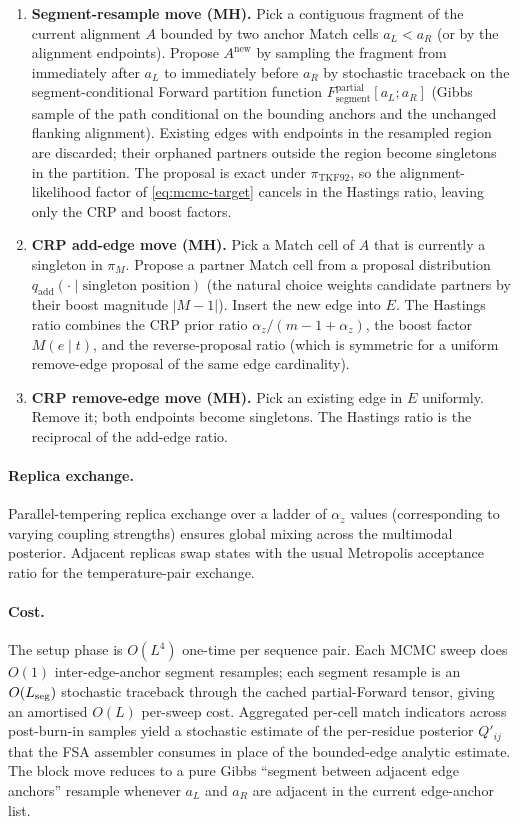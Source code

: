 \begin{enumerate}
\item \textbf{Segment-resample move (MH).} Pick a contiguous
  fragment of the current alignment $A$ bounded by two anchor
  Match cells $a_L < a_R$ (or by the alignment endpoints). Propose
  $A^{\mathrm{new}}$ by sampling the fragment from immediately
  after $a_L$ to immediately before $a_R$ by stochastic traceback
  on the segment-conditional Forward partition function
  $F^{\mathrm{partial}}_{\mathrm{segment}}[a_L; a_R]$ (Gibbs sample
  of the path conditional on the bounding anchors and the
  unchanged flanking alignment). Existing edges with endpoints in
  the resampled region are discarded; their orphaned partners
  outside the region become singletons in the partition. The
  proposal is exact under $\pi_{\mathrm{TKF92}}$, so the
  alignment-likelihood factor of \eqref{eq:mcmc-target} cancels in
  the Hastings ratio, leaving only the CRP and boost factors.

\item \textbf{CRP add-edge move (MH).} Pick a Match cell of $A$
  that is currently a singleton in $\pi_{\!M}$. Propose a partner
  Match cell from a proposal distribution
  $q_{\mathrm{add}}(\cdot \mid \text{singleton position})$ (the
  natural choice weights candidate partners by their boost
  magnitude $|M - 1|$). Insert the new edge into $E$. The Hastings
  ratio combines the CRP prior ratio
  $\alpha_z / (m - 1 + \alpha_z)$, the boost factor $M(e \mid t)$,
  and the reverse-proposal ratio (which is symmetric for a uniform
  remove-edge proposal of the same edge cardinality).

\item \textbf{CRP remove-edge move (MH).} Pick an existing edge in
  $E$ uniformly. Remove it; both endpoints become singletons. The
  Hastings ratio is the reciprocal of the add-edge ratio.
\end{enumerate}

\paragraph{Replica exchange.} Parallel-tempering replica exchange
over a ladder of $\alpha_z$ values (corresponding to varying
coupling strengths) ensures global mixing across the
multimodal posterior. Adjacent replicas swap states with the usual
Metropolis acceptance ratio for the temperature-pair exchange.

\paragraph{Cost.} The setup phase is $O(L^4)$ one-time per
sequence pair. Each MCMC sweep does $O(1)$ inter-edge-anchor
segment resamples; each segment resample is an $O(L_{\rm seg})$
stochastic traceback through the cached partial-Forward tensor,
giving an amortised $O(L)$ per-sweep cost. Aggregated
per-cell match indicators across post-burn-in samples yield a
stochastic estimate of the per-residue posterior $Q'_{ij}$ that
the FSA assembler consumes in place of the bounded-edge analytic
estimate. The block move reduces to a pure Gibbs ``segment
between adjacent edge anchors'' resample whenever $a_L$ and $a_R$
are adjacent in the current edge-anchor list.

